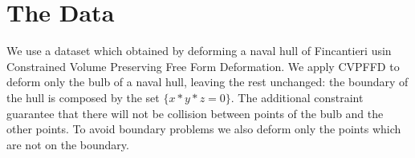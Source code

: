 \documentclass{article}
\begin{document}
\section{The Data}
We use a dataset which obtained by deforming a naval hull of Fincantieri usin Constrained Volume Preserving Free Form Deformation.
We apply CVPFFD to deform only the bulb of a naval hull, leaving the rest unchanged: the boundary of the hull is composed by the set $\{x*y*z=0\}$. The additional constraint guarantee that there will not be collision between points of the bulb and the other points. To avoid boundary problems we also deform only the points which are not on the boundary.
	
\begin{comment}
\subsection{Generation}


\end{comment}
\end{document}
